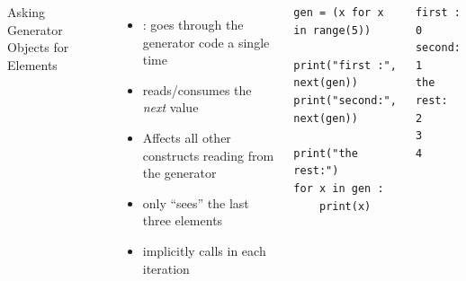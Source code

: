 \begin{frame}[fragile]
%
\begin{columns}[T]
\begin{Large}
	{Asking Generator Objects for Elements}
	\vspace{6pt}
\end{Large}
\begin{itemize}
\item {}: goes through the generator code a single time
\item[\Thus] reads/consumes the \emph{next} value
\item Affects all other constructs reading from the generator
\item[\Thus]  only \enquote{sees} the last three elements
\item {} implicitly calls  in each iteration
\end{itemize}
%
\begin{codebox}
\begin{verbatim}
gen = (x for x in range(5))

print("first :", next(gen))
print("second:", next(gen))

print("the rest:")
for x in gen :
    print(x)
\end{verbatim}
\end{codebox}
%
\begin{cmdbox}
\begin{verbatim}
first : 0
second: 1
the rest:
2
3
4
\end{verbatim}
\end{cmdbox}
\end{columns}
%
\end{frame}


